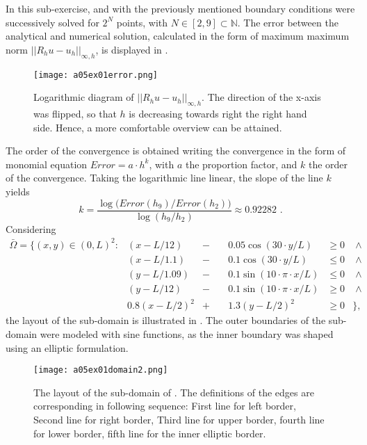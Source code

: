 %
In this sub-exercise,  and  with the previously mentioned boundary conditions were successively solved for $2^N$ points, with $N \in [2,9] \subset \mathbb{N}$.
The error between the analytical and numerical solution, calculated in the form of maximum maximum norm $|| R_h u - u_h||_{\infty , h}$, is displayed in .
%
\vspace*{\FigUpperVSpace}
%
\begin{figure}[H]
	\centering
	\texttt{[image: a05ex01error.png]} 
	\caption{Logarithmic diagram of $|| R_h u - u_h||_{\infty , h}$.
			 The direction of the x-axis was flipped, so that $h$ is decreasing towards right the right hand side.
			 Hence, a more comfortable overview can be attained.}
	\label{fig:a05ex01error}
\end{figure}
The order of the convergence is obtained writing the convergence in the form of monomial equation $Error = a \cdot h ^k$, with $a$ the proportion factor, and $k$ the order of the convergence.
Taking the logarithmic line linear, the slope of the line $k$ yields
\begin{equation}
	k = \frac{\log{(Error(h_9) / Error(h_2)})}{\log{(h_9 / h_2)}}\approx 0.92282 \text{ .}
\end{equation}
%
Considering
\begin{align}
	\nonumber
	\bar{\Omega} = \{(x,y) \in (0,L)^2 \colon &(x - L/12) &-& \;&0.05 \cos(30 \cdot y / L) 			&\geq 0& \; \land \\
	\nonumber
											  &(x - L/1.1) &-& \;&0.1\cos(30 \cdot y / L) 			&\leq 0& \; \land \\
	\nonumber
											  &(y - L/1.09) &-& \; &0.1\sin(10 \cdot \pi \cdot x / L) &\leq 0& \; \land \\
	\nonumber
											  &(y - L/12) &-& \; &0.1\sin(10 \cdot \pi \cdot x / L) 	&\geq 0& \; \land \\
	\label{eq:domain2}
											  &0.8(x-L/2)^2 &+& \; &1.3(y-L/2)^2  				  	&\geq 0& \} \text{,}
\end{align}
the layout of the sub-domain is illustrated in .
The outer boundaries of the sub-domain were modeled with sine functions, as the inner boundary was shaped using an elliptic formulation.\\
%
\vspace*{\FigUpperVSpace}
\begin{figure}[H]
	\centering
	\texttt{[image: a05ex01domain2.png]} 
	\caption{The layout of the sub-domain of . The definitions of the edges are corresponding in following sequence: First line for left border, Second line for right  border, Third line for upper border, fourth line for lower border, fifth line for the inner elliptic border.}
	\label{fig:a05ex01domain2}
\end{figure}
